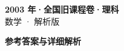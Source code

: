 \documentclass[zihao=-4, a4paper]{ctexart}
\begin{document}
\begin{center}
  {\Large\bfseries 2003 年·全国旧课程卷·理科}\\[4pt]
  {\large 数学 · 解析版}
\end{center}
\medskip
{}

\clearpage
{}
\begin{center}{\Large\bfseries 参考答案与详细解析}\end{center}
\medskip

\end{document}
